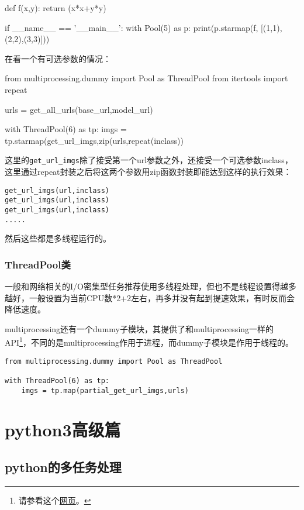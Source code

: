 \documentclass[12pt,oneside]{book}
\begin{document}
\begin{common-format}
\begin{tcbpython}[]
def f(x,y):
    return (x*x+y*y)

if __name__ == '__main__':
    with Pool(5) as p:
        print(p.starmap(f, [(1,1),(2,2),(3,3)]))
\end{tcbpython}

在看一个有可选参数的情况：

\begin{tcbpython}[]
from multiprocessing.dummy import Pool as ThreadPool
from itertools import repeat

urls = get_all_urls(base_url,model_url)

with ThreadPool(6) as tp:
    imgs = tp.starmap(get_url_imgs,zip(urls,repeat(inclass))
\end{tcbpython}
这里的\verb+get_url_imgs+除了接受第一个url参数之外，还接受一个可选参数inclass，这里通过repeat封装之后将这两个参数用zip函数封装即能达到这样的执行效果：
\begin{Verbatim}
get_url_imgs(url,inclass)
get_url_imgs(url,inclass)
get_url_imgs(url,inclass)
.....
\end{Verbatim}
然后这些都是多线程运行的。


\section{ThreadPool类}
一般和网络相关的I/O密集型任务推荐使用多线程处理，但也不是线程设置得越多越好，一般设置为当前CPU数*2+2左右，再多并没有起到提速效果，有时反而会降低速度。

multiprocessing还有一个dummy子模块，其提供了和multiprocessing一样的API\footnote{请参看这个\href{http://segmentfault.com/blog/caspar/1190000000414339b}{网页}。}，不同的是multiprocessing作用于进程，而dummy子模块是作用于线程的。


\begin{Verbatim}
from multiprocessing.dummy import Pool as ThreadPool

with ThreadPool(6) as tp:
    imgs = tp.map(partial_get_url_imgs,urls)
\end{Verbatim}



\part{python3高级篇}

\chapter{python的多任务处理}


\end{common-format}
\end{document}
